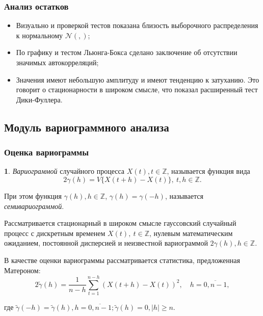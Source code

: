 \documentclass[notheorems]{beamer}
\theoremstyle{definition}
\newtheorem{definition}{\translate{Definition}}
\theoremstyle{example}
\theoremstyle{plain}
\newenvironment{Definition}{\begin{definition}}{\end{definition}}
\newcommand{\inp}[1]{}
\newcommand{\descriptive}[2]{\inp{#1/descriptive/#2}}
\newcommand{\resnormaldistr}{$\mathcal{N}(\descriptive{residual}{mean}, \descriptive{residual}{variance})$}
\begin{document}
\begin{frame}
  \frametitle{Анализ остатков}
  \begin{itemize}
    \item Визуально и проверкой тестов показана близость выборочного распределения к нормальному \resnormaldistr;
    \item По графику и тестом Льюнга-Бокса сделано заключение об отсутствии значимых автокорреляций;
    \item Значения имеют небольшую амплитуду и имеют тенденцию к затуханию. Это говорит о стационарности в широком смысле, что показал расширенный тест Дики-Фуллера.
  \end{itemize}
\end{frame}

\subsection{Модуль вариограммного анализа}

\begin{frame}
\begin{footnotesize}
  \frametitle{Оценка вариограммы}
  \begin{Definition}
    \textit{Вариограммой} случайного процесса $ X(t), t \in \mathbb{Z} $, называется функция вида
    \begin{equation}
    \label{eq:matheron}
        2 \gamma (h) = V \{ X(t + h) - X(t) \},~ t, h \in \mathbb{Z}.
    \end{equation}

    При этом функция $ \gamma (h), h \in \mathbb{Z} $, $ \gamma(h) = \gamma(-h)$, называется \textit{семивариограммой}.
  \end{Definition}
  
  \vspace{0.5em}
  
  Рассматривается стационарный в широком смысле гауссовский случайный процесс с дискретным временем $ X(t),~ t \in \mathbb{Z} $, нулевым математическим ожиданием, постоянной дисперсией и неизвестной вариограммой $ 2 \gamma(h), h \in \mathbb{Z} $.
\end{footnotesize}
  
  \vspace{0.5em}
  
  В качестве оценки вариограммы рассматривается статистика, предложенная Матероном:
  \begin{equation}
    2 \tilde{\gamma}(h) = \frac{1}{n - h} \sum_{t = 1}^{n - h}(X(t + h) - X(t))^2, \quad h = \overline{0, n - 1},
  \end{equation}

  \vspace{-0.4em}
  \begin{footnotesize}
  где $ \tilde{\gamma}(-h) = \tilde{\gamma}(h), h = \overline{0, n - 1}; \tilde{\gamma}(h) = 0, |h| \ge n $.
  \end{footnotesize}
\end{frame}
\end{document}
